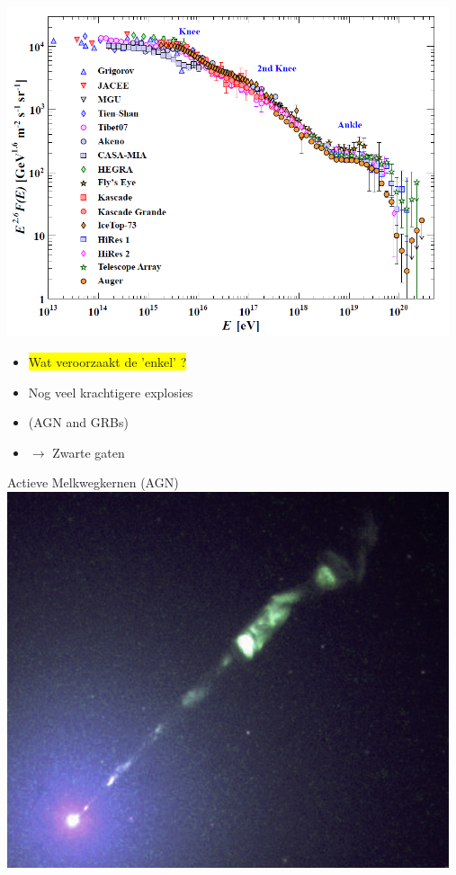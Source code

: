 \newpage
%
\includegraphics[keepaspectratio,width=13cm]{cr-all-scaled26}
%
\begin{itemize}
\item[] \colorbox{yellow}{Wat veroorzaakt de 'enkel' ?}
\item[] Nog veel krachtigere explosies
\item[] (AGN and GRBs)
\item[] $\rightarrow$ Zwarte gaten
\end{itemize}

\Tr
\begin{center}
{\blue Actieve Melkwegkernen (AGN)}\\[1cm]
\includegraphics[keepaspectratio,width=13cm]{M87jet}
\end{center}

